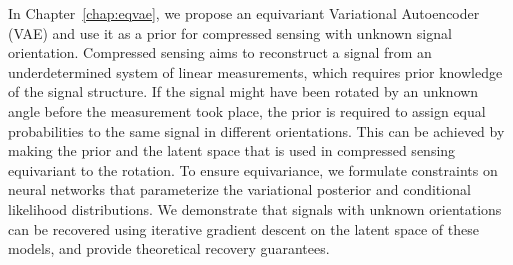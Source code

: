 In Chapter~\ref{chap:eqvae}, we propose an equivariant Variational Autoencoder (VAE) and use it as a prior for compressed sensing with unknown signal orientation. 
Compressed sensing aims to reconstruct a signal from an underdetermined system of linear measurements, which requires prior knowledge of the signal structure. 
If the signal might have been rotated by an unknown angle before the measurement took place, the prior is required to assign equal probabilities to the same signal in different orientations. 
This can be achieved by making the prior and the latent space that is used in compressed sensing equivariant to the rotation. 
To ensure equivariance, we formulate constraints on neural networks that parameterize the variational posterior and conditional likelihood distributions. 
We demonstrate that signals with unknown orientations can be recovered using iterative gradient descent on the latent space of these models, and provide theoretical recovery guarantees.







